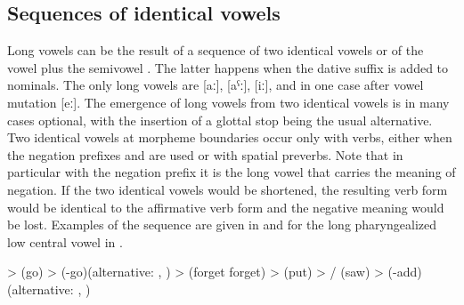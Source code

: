 \subsection{Sequences of identical vowels}
\label{ssec:Sequences of identical vowels}

Long vowels can be the result of a sequence of two identical vowels or of the vowel  plus the semivowel . The latter happens when the dative suffix is added to nominals. The only long vowels are [aː], [aˁː], [iː], and in one case after vowel mutation [eː]. The emergence of long vowels from two identical vowels is in many cases optional, with the insertion of a glottal stop being the usual alternative. Two identical vowels at morpheme boundaries occur only with verbs, either when the negation prefixes  and  are used or with spatial preverbs. Note that in particular with the negation prefix it is the long vowel that carries the meaning of negation. If the two identical vowels would be shortened, the resulting verb form would be identical to the affirmative verb form and the negative meaning would be lost. Examples of the sequence are given in  and for the long pharyngealized low central vowel in .
%
\begin{exe}
	\ex	\label{ex:identical vowels A phon}
	\begin{xlist}
		\ex	{} >   (go)
		\ex	{} >   (-go)\newline\hspace*{1em}(alternative: , )
		\ex	{} >  \newline\hspace*{1em}(forget forget) 
		\ex	{} >  \newline\hspace*{1em}(put)
		\ex	{} > \slash{}  (saw)
		\ex	{} >   (-add)\newline\hspace*{1em}(alternative: , )
	\end{xlist}
\end{exe}

